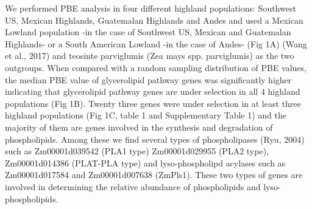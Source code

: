\documentclass[9pt,twocolumn,twoside,lineno]{gsajnl}
\begin{document}
We performed PBE analysis in four different highland populations: Southwest US, Mexican Highlands, Guatemalan Highlands and Andes and used a Mexican Lowland population -in the case of Southwest US, Mexican and Guatemalan Highlands- or a South American Lowland -in the case of Andes- (Fig 1A) (Wang et al., 2017) and teosinte parviglumis (Zea mays spp. parviglumis) as the two outgroups. 
When compared with a random sampling distribution of PBE values, the median PBE value of glycerolipid pathway genes was significantly higher indicating that glycerolipid pathway genes are under selection in all 4 highland populations (Fig 1B). 
Twenty three genes were under selection in at least three highland populations (Fig 1C, table 1 and Supplementary Table 1) and the majority of them are genes involved in the synthesis and degradation of phospholipids. 
Among these we find several types of phospholipases (Ryu, 2004) such as Zm00001d039542 (PLA1 type) Zm00001d029955 (PLA2 type), Zm00001d014386 (PLAT-PLA type) and lyso-phospholipd acylases such as Zm00001d017584 and Zm00001d007638 (ZmPls1).  
These two types of genes are involved in determining the relative abundance of phospholipids and lyso-phospholipids. 
\end{document}
